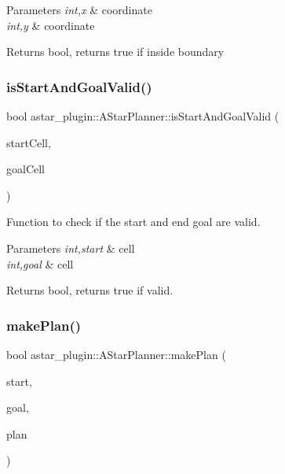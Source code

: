 \begin{DoxyParams}{Parameters}
{\em int,x} & coordinate \\
\hline
{\em int,y} & coordinate \\
\hline
\end{DoxyParams}
\begin{DoxyReturn}{Returns}
bool, returns true if inside boundary 
\end{DoxyReturn}
\mbox{\label{classastar__plugin_1_1_a_star_planner_a755e2c8b550458a1c4640a86fca1d993}} 
\subsubsection{\texorpdfstring{is\+Start\+And\+Goal\+Valid()}{isStartAndGoalValid()}}
{\footnotesize\ttfamily bool astar\+\_\+plugin\+::\+A\+Star\+Planner\+::is\+Start\+And\+Goal\+Valid (\begin{DoxyParamCaption}\item[{int}]{start\+Cell,  }\item[{int}]{goal\+Cell }\end{DoxyParamCaption})}



Function to check if the start and end goal are valid. 


\begin{DoxyParams}{Parameters}
{\em int,start} & cell \\
\hline
{\em int,goal} & cell \\
\hline
\end{DoxyParams}
\begin{DoxyReturn}{Returns}
bool, returns true if valid. 
\end{DoxyReturn}
\mbox{\label{classastar__plugin_1_1_a_star_planner_a0452b64fca4b454fad7da2249494a9fd}} 
\subsubsection{\texorpdfstring{make\+Plan()}{makePlan()}}
{\footnotesize\ttfamily bool astar\+\_\+plugin\+::\+A\+Star\+Planner\+::make\+Plan (\begin{DoxyParamCaption}\item[{const geometry\+\_\+msgs\+::\+Pose\+Stamped \&}]{start,  }\item[{const geometry\+\_\+msgs\+::\+Pose\+Stamped \&}]{goal,  }\item[{std\+::vector$<$ geometry\+\_\+msgs\+::\+Pose\+Stamped $>$ \&}]{plan }\end{DoxyParamCaption})}



